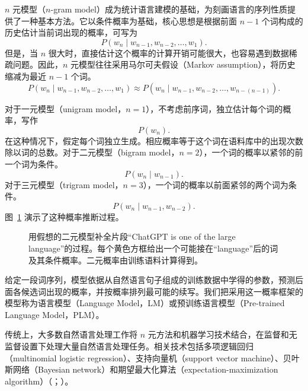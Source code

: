 $n$ 元模型（$n$-gram model）成为统计语言建模的基础，为刻画语言的序列性质提供了一种基本方法。它以条件概率为基础，核心思想是根据前面 $n-1$ 个词构成的历史估计当前词出现的概率，可写为
\[
P(w_n\mid w_{n-1},w_{n-2},\ldots,w_1).
\]
但是，当 $n$ 很大时，直接估计这个概率的计算开销可能很大，也容易遇到数据稀疏问题。因此，$n$ 元模型往往采用马尔可夫假设（Markov assumption），将历史缩减为最近 $n-1$ 个词。
\[
P(w_n\mid w_{n-1},w_{n-2},\ldots,w_1)
\approx P(w_n\mid w_{n-1},w_{n-2},\ldots,w_{n-(n-1)}).
\]

对于一元模型（unigram model，$n=1$），不考虑前序词，独立估计每个词的概率，写作
\[
P(w_n).
\]
在这种情况下，假定每个词独立生成。相应概率等于这个词在语料库中的出现次数除以词的总数。对于二元模型（bigram model，$n=2$），一个词的概率以紧邻的前一个词为条件。
\[
P(w_n\mid w_{n-1}).
\]
对于三元模型（trigram model，$n=3$），一个词的概率以前面紧邻的两个词为条件。
\[
P(w_n\mid w_{n-1},w_{n-2}).
\]
图~\ref{fig:ch01-bigram} 演示了这种概率推断过程。

\begin{figure}[!htbp]
\centering

\caption{用假想的二元模型补全片段“ChatGPT is one of the large language”的过程。每个黄色方框给出一个可能接在“language”后的词及其条件概率。二元概率由训练语料计算得到。}
\label{fig:ch01-bigram}
\end{figure}

\begin{keypoint}
给定一段词序列，模型依据从自然语言句子组成的训练数据中学得的参数，预测后面各候选词出现的概率，并按概率排列最可能的续写。我们把采用这一概率框架的模型称为语言模型（Language Model，LM）或预训练语言模型（Pre-trained Language Model，PLM）。
\end{keypoint}

传统上，大多数自然语言处理工作将 $n$ 元方法和机器学习技术结合，在监督和无监督设置下处理大量自然语言处理任务。相关技术包括多项逻辑回归（multinomial logistic regression）、支持向量机（support vector machine）、贝叶斯网络（Bayesian network）和期望最大化算法（expectation-maximization algorithm）（；）。

